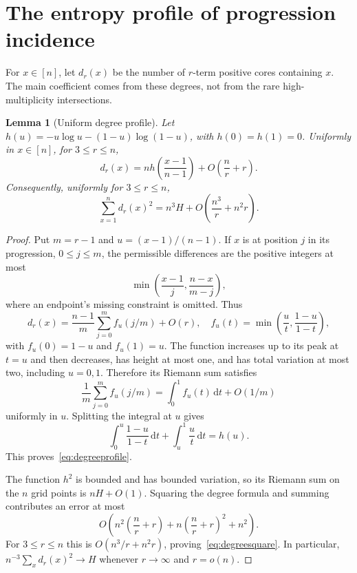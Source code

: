 \documentclass[11pt]{article}
\newtheorem{lemma}[theorem]{Lemma}
\theoremstyle{definition}\newtheorem{definition}[theorem]{Definition}
\theoremstyle{remark}\newtheorem{remark}[theorem]{Remark}
\newcommand{\dd}{\,\mathrm d}
\begin{document}
\section{The entropy profile of progression incidence}\label{sec:entropy}
For $x\in[n]$, let $d_r(x)$ be the number of $r$-term positive cores
containing $x$. The main coefficient comes from these degrees, not from
the rare high-multiplicity intersections.

\begin{lemma}[Uniform degree profile]\label{lem:degree}
Let $h(u)=-u\log u-(1-u)\log(1-u)$, with $h(0)=h(1)=0$.
Uniformly in $x\in[n]$, for $3\le r\le n$,
\begin{equation}
 d_r(x)=n h\left(\frac{x-1}{n-1}\right)
              +O\left(\frac nr+r\right).\label{eq:degreeprofile}
\end{equation}
Consequently, uniformly for $3\le r\le n$,
\begin{equation}
 \sum_{x=1}^n d_r(x)^2
       =n^3H+O\left(\frac{n^3}{r}+n^2r\right).
 \label{eq:degreesquare}
\end{equation}
\end{lemma}
\begin{proof}
Put $m=r-1$ and $u=(x-1)/(n-1)$. If $x$ is at position $j$ in its
progression, $0\le j\le m$, the permissible differences are the positive
integers at most
\[
 \min\left(\frac{x-1}{j},\frac{n-x}{m-j}\right),
\]
where an endpoint's missing constraint is omitted. Thus
\[
 d_r(x)=\frac{n-1}{m}\sum_{j=0}^{m}f_u(j/m)+O(r),
 \quad
 f_u(t)=\min\left(\frac ut,\frac{1-u}{1-t}\right),
\]
with $f_u(0)=1-u$ and $f_u(1)=u$. The function increases up to its peak
at $t=u$ and then decreases, has height at most one, and has total
variation at most two, including $u=0,1$. Therefore its Riemann sum
satisfies
\[
 \frac1m\sum_{j=0}^m f_u(j/m)=\int_0^1 f_u(t)\dd t+O(1/m)
\]
uniformly in $u$. Splitting the integral at $u$ gives
\[
 \int_0^u\frac{1-u}{1-t}\dd t
 +\int_u^1\frac u t\dd t=h(u).
\]
This proves~\eqref{eq:degreeprofile}.

The function $h^2$ is bounded and has bounded variation, so its Riemann
sum on the $n$ grid points is $nH+O(1)$. Squaring the degree formula
and summing contributes an error at most
\[
 O\left(n^2\left(\frac nr+r\right)
          +n\left(\frac nr+r\right)^2+n^2\right).
\]
For $3\le r\le n$ this is
$O(n^3/r+n^2r)$, proving~\eqref{eq:degreesquare}. In particular,
$n^{-3}\sum_xd_r(x)^2\to H$ whenever $r\to\infty$ and $r=o(n)$.
\end{proof}
\end{document}
